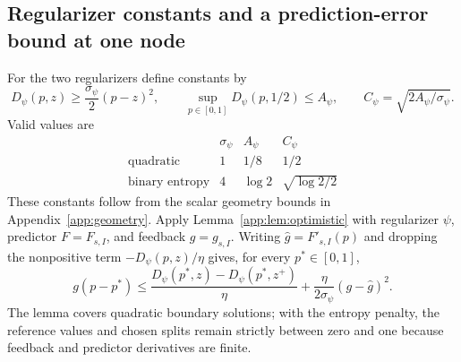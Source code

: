 \documentclass[11pt]{article}
\theoremstyle{plain}
\theoremstyle{remark}
\numberwithin{equation}{section}
\begin{document}
\subsection{Regularizer constants and a prediction-error bound at one node}
For the two regularizers define constants by
\begin{equation}\label{ch6:eq:geometry}
 {D_\psi}(p,z)\ge\frac{\sigma_\psi}{2}(p-z)^2,\qquad
 \sup_{p\in[0,1]}{D_\psi}(p,1/2)\le{A_\psi},\qquad
 {C_\psi}=\sqrt{2{A_\psi}/\sigma_\psi}.
\end{equation}
Valid values are
\begin{equation}\label{ch6:eq:constants}
 \begin{array}{c|ccc}
 &\sigma_\psi&{A_\psi}&{C_\psi}\\\hline
 \text{quadratic}&1&1/8&1/2\\
 \text{binary entropy}&4&\log2&\sqrt{\log2/2}
 \end{array}
\end{equation}
These constants follow from the scalar geometry bounds in
Appendix~\ref{app:geometry}.
Apply Lemma~\ref{app:lem:optimistic} with regularizer
$\psi$, predictor $F=F_{s,I}$, and feedback $g=g_{s,I}$.
Writing $\widehat g=F'_{s,I}(p)$ and dropping the nonpositive term
$-D_\psi(p,z)/\eta$ gives, for every $p^*\in[0,1]$,
\begin{equation}\label{ch6:eq:one-step}
 g(p-p^*)\le
 \frac{D_\psi(p^*,z)-D_\psi(p^*,z^+)}\eta
 +\frac\eta{2\sigma_\psi}(g-\widehat g)^2.
\end{equation}
The lemma covers quadratic boundary solutions; with the entropy penalty, the reference values and chosen splits
remain strictly between zero and one because feedback and predictor derivatives are finite.
\end{document}
